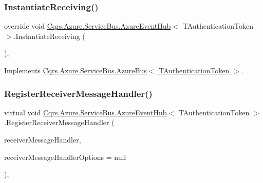 \mbox{\label{classCqrs_1_1Azure_1_1ServiceBus_1_1AzureEventHub_aa725781eddb65bdfe456a4fecb36fb6b_aa725781eddb65bdfe456a4fecb36fb6b}} 
\subsubsection{\texorpdfstring{Instantiate\+Receiving()}{InstantiateReceiving()}}
{\footnotesize\ttfamily override void \hyperlink{classCqrs_1_1Azure_1_1ServiceBus_1_1AzureEventHub}{Cqrs.\+Azure.\+Service\+Bus.\+Azure\+Event\+Hub}$<$ T\+Authentication\+Token $>$.Instantiate\+Receiving (\begin{DoxyParamCaption}{ }\end{DoxyParamCaption})\hspace{0.3cm}{\ttfamily [protected]}, {\ttfamily [virtual]}}



Implements \hyperlink{classCqrs_1_1Azure_1_1ServiceBus_1_1AzureBus_ac9f66dd531dcde49be72ba8f2cb28e9b_ac9f66dd531dcde49be72ba8f2cb28e9b}{Cqrs.\+Azure.\+Service\+Bus.\+Azure\+Bus$<$ T\+Authentication\+Token $>$}.

\mbox{\label{classCqrs_1_1Azure_1_1ServiceBus_1_1AzureEventHub_afbea0e107f3d4e8f8d4f2215ff2f7787_afbea0e107f3d4e8f8d4f2215ff2f7787}} 
\subsubsection{\texorpdfstring{Register\+Receiver\+Message\+Handler()}{RegisterReceiverMessageHandler()}}
{\footnotesize\ttfamily virtual void \hyperlink{classCqrs_1_1Azure_1_1ServiceBus_1_1AzureEventHub}{Cqrs.\+Azure.\+Service\+Bus.\+Azure\+Event\+Hub}$<$ T\+Authentication\+Token $>$.Register\+Receiver\+Message\+Handler (\begin{DoxyParamCaption}\item[{Action$<$ Partition\+Context, Event\+Data $>$}]{receiver\+Message\+Handler,  }\item[{Event\+Processor\+Options}]{receiver\+Message\+Handler\+Options = {\ttfamily null} }\end{DoxyParamCaption})\hspace{0.3cm}{\ttfamily [protected]}, {\ttfamily [virtual]}}

